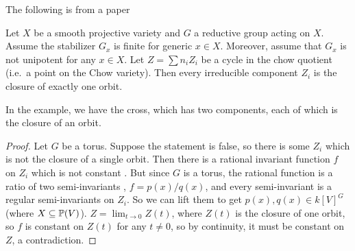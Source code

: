 The following is from a paper 
\begin{proposition}
 Let $X$ be a smooth projective variety and $G$ a reductive group acting on $X$. Assume the stabilizer $G_x$ is finite for generic $x\in X$. Moreover, assume that $G_x$ is not unipotent for any $x\in X$. Let $Z=\sum n_iZ_i$ be a cycle in the chow quotient (i.e.~a point on the Chow variety). Then every irreducible component $Z_i$ is the closure of exactly one orbit.
\end{proposition}
In the example, we have the cross, which has two components, each of which is the closure of an orbit.
\begin{proof}
  Let $G$ be a torus. Suppose the statement is false, so there is some $Z_i$ which is not the closure of a single orbit. Then there is a rational invariant function $f$ on $Z_i$ which is not constant . But since $G$ is a torus, the rational function is a ratio of two semi-invariants , $f=p(x)/q(x)$, and every semi-invariant is a regular semi-invariants on $Z_i$. So we can lift them to get $p(x),q(x)\in k[V]^G$ (where $X\subseteq \mathbb{P}(V)$). $Z=\lim_{t\to 0}Z(t)$, where $Z(t)$ is the closure of one orbit, so $f$ is constant on $Z(t)$ for any $t\neq 0$, so by continuity, it must be constant on $Z$, a contradiction.
\end{proof}
